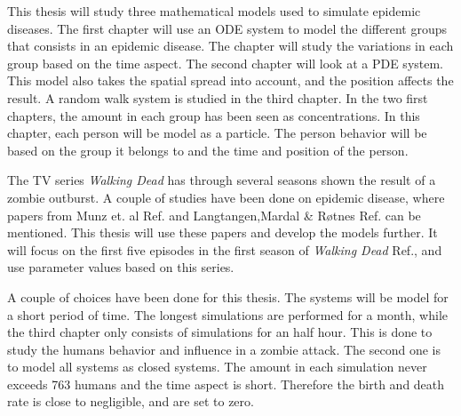 \documentclass[%
twoside,                 %
final,                   %
chapterprefix=true,      %
open=right               %
10pt]{book}
\newcommand{\clearemptydoublepage}{\clearpage{\pagestyle{empty}\cleardoublepage}}
\begin{document}
\vspace{3mm}




\vspace{3mm}


This thesis will study three mathematical models used to simulate epidemic diseases. The first chapter will use an ODE system to model the different groups that consists in an epidemic disease. The chapter will study the variations in each group based on the time aspect. The second chapter will look at a PDE system. This model also takes the spatial spread into account, and the position affects the result. A random walk system is studied in the third chapter. In the two first chapters, the amount in each group has been seen as concentrations. In this chapter, each person will be model as a particle. The person behavior will be based on the group it belongs to and the time and position of the person. 


\vspace{3mm}




\vspace{3mm}


The TV series \emph{Walking Dead} has through several seasons shown the result of a zombie outburst. A couple of studies have been done on epidemic disease, where papers from Munz et. al Ref.\cite{munz2009zombies} and Langtangen,Mardal {\&} Røtnes Ref.\cite{zombie-math} can be mentioned. This thesis will use these papers and develop the models further. It will focus on the first five episodes in the first season of \emph{Walking Dead} Ref.\cite{walking_dead}, and use parameter values based on this series. 


\vspace{3mm}




\vspace{3mm}


A couple of choices have been done for this thesis. The systems will be model for a short period of time. The longest simulations are performed for a month, while the third chapter only consists of simulations for an half hour. This is done to study the humans behavior and influence in a zombie attack. The second one is to model all systems as closed systems. The amount in each simulation never exceeds 763 humans and the time aspect is short. Therefore the birth and death rate is close to negligible, and are set to zero.    



\clearemptydoublepage
{}
\thispagestyle{empty}








\clearemptydoublepage
{}
\thispagestyle{empty}
\printindex
\end{document}
